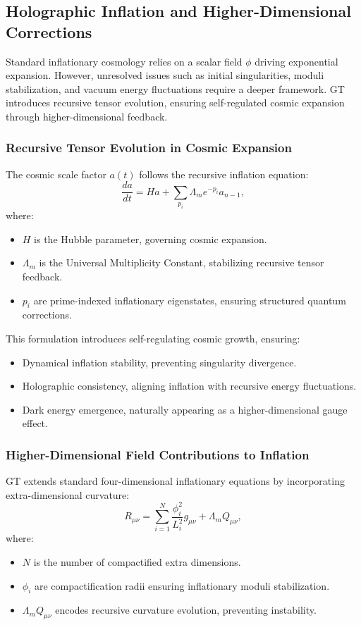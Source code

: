 \documentclass{article}
\theoremstyle{plain}
\begin{document}
\subsection{Holographic Inflation and Higher-Dimensional Corrections}
Standard inflationary cosmology relies on a scalar field $\phi$ driving exponential expansion. However, unresolved issues such as initial singularities, moduli stabilization, and vacuum energy fluctuations require a deeper framework. GT introduces recursive tensor evolution, ensuring self-regulated cosmic expansion through higher-dimensional feedback.

\subsubsection{Recursive Tensor Evolution in Cosmic Expansion}
The cosmic scale factor $a(t)$ follows the recursive inflation equation:
\begin{equation}
\frac{d a}{dt} = H a + \sum_{p_i} \Lambda_m e^{-p_i} a_{n-1},
\end{equation}
where:
\begin{itemize}
\item $H$ is the Hubble parameter, governing cosmic expansion.
\item $\Lambda_m$ is the Universal Multiplicity Constant, stabilizing recursive tensor feedback.
\item $p_i$ are prime-indexed inflationary eigenstates, ensuring structured quantum corrections.
\end{itemize}

This formulation introduces self-regulating cosmic growth, ensuring:
\begin{itemize}
\item Dynamical inflation stability, preventing singularity divergence.
\item Holographic consistency, aligning inflation with recursive energy fluctuations.
\item Dark energy emergence, naturally appearing as a higher-dimensional gauge effect.
\end{itemize}

\subsubsection{Higher-Dimensional Field Contributions to Inflation}
GT extends standard four-dimensional inflationary equations by incorporating extra-dimensional curvature:
\begin{equation}
R_{\mu\nu} = \sum_{i=1}^{N} \frac{\phi_i^2}{L_i^2} g_{\mu\nu} + \Lambda_m Q_{\mu\nu},
\end{equation}
where:
\begin{itemize}
\item $N$ is the number of compactified extra dimensions.
\item $\phi_i$ are compactification radii ensuring inflationary moduli stabilization.
\item $\Lambda_m Q_{\mu\nu}$ encodes recursive curvature evolution, preventing instability.
\end{itemize}
\end{document}
